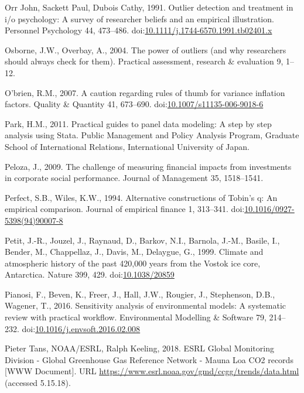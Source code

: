 \documentclass[12pt,]{article}
\begin{document}
\hypertarget{ref-OrrJohn1991}{}
Orr John, Sackett Paul, Dubois Cathy, 1991. Outlier detection and
treatment in i/o psychology: A survey of researcher beliefs and an
empirical illustration. Personnel Psychology 44, 473--486.
doi:\href{https://doi.org/10.1111/j.1744-6570.1991.tb02401.x}{10.1111/j.1744-6570.1991.tb02401.x}

\hypertarget{ref-Osborne2004}{}
Osborne, J.W., Overbay, A., 2004. The power of outliers (and why
researchers should always check for them). Practical assessment,
research \& evaluation 9, 1--12.

\hypertarget{ref-Obrien2007}{}
O'brien, R.M., 2007. A caution regarding rules of thumb for variance
inflation factors. Quality \& Quantity 41, 673--690.
doi:\href{https://doi.org/10.1007/s11135-006-9018-6}{10.1007/s11135-006-9018-6}

\hypertarget{ref-Park2011}{}
Park, H.M., 2011. Practical guides to panel data modeling: A step by
step analysis using Stata. Public Management and Policy Analysis
Program, Graduate School of International Relations, International
University of Japan.

\hypertarget{ref-Peloza2009}{}
Peloza, J., 2009. The challenge of measuring financial impacts from
investments in corporate social performance. Journal of Management 35,
1518--1541.

\hypertarget{ref-Perfect1994}{}
Perfect, S.B., Wiles, K.W., 1994. Alternative constructions of Tobin's
q: An empirical comparison. Journal of empirical finance 1, 313--341.
doi:\href{https://doi.org/10.1016/0927-5398(94)90007-8}{10.1016/0927-5398(94)90007-8}

\hypertarget{ref-Petit1999}{}
Petit, J.-R., Jouzel, J., Raynaud, D., Barkov, N.I., Barnola, J.-M.,
Basile, I., Bender, M., Chappellaz, J., Davis, M., Delaygue, G., 1999.
Climate and atmospheric history of the past 420,000 years from the
Vostok ice core, Antarctica. Nature 399, 429.
doi:\href{https://doi.org/10.1038/20859}{10.1038/20859}

\hypertarget{ref-Pianosi2016}{}
Pianosi, F., Beven, K., Freer, J., Hall, J.W., Rougier, J., Stephenson,
D.B., Wagener, T., 2016. Sensitivity analysis of environmental models: A
systematic review with practical workflow. Environmental Modelling \&
Software 79, 214--232.
doi:\href{https://doi.org/10.1016/j.envsoft.2016.02.008}{10.1016/j.envsoft.2016.02.008}

\hypertarget{ref-PieterTans2018}{}
Pieter Tans, NOAA/ESRL, Ralph Keeling, 2018. ESRL Global Monitoring
Division - Global Greenhouse Gas Reference Network - Mauna Loa CO2
records {[}WWW Document{]}. URL
\url{https://www.esrl.noaa.gov/gmd/ccgg/trends/data.html} (accessed
5.15.18).
\end{document}
